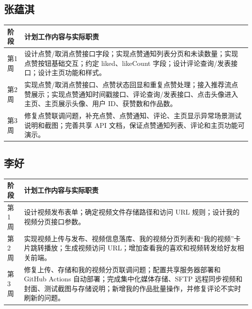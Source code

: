 \documentclass[UTF8,a4paper,12pt,fontset=fandol]{ctexart}
\begin{document}
\subsection{张蕴淇}
\begin{table}[H]
\centering
\small
\begin{tabularx}{\textwidth}{p{1.7cm} X}
\toprule
阶段 & 计划工作内容与实际职责 \\
\midrule
第1周 & 设计点赞/取消点赞接口字段；实现点赞通知列表分页和未读数量；实现点赞按钮基础交互；约定 liked、likeCount 字段；设计评论查询/发表接口；设计主页功能和样式。 \\
第2周 & 实现点赞/取消点赞接口、点赞状态回显和重复点赞处理；接入推荐流点赞展示；实现点赞通知时间戳接口、评论查询/发表接口、点击头像进入主页、主页展示头像、用户 ID、获赞数和作品数。 \\
第3周 & 修复点赞联调问题，补充点赞、点赞通知、评论、主页显示异常场景测试说明和截图；完善共享 API 文档，保证点赞通知列表、评论和主页功能可演示。 \\
\bottomrule
\end{tabularx}
\normalsize
\end{table}

\subsection{李好}
\begin{table}[H]
\centering
\small
\begin{tabularx}{\textwidth}{p{1.7cm} X}
\toprule
阶段 & 计划工作内容与实际职责 \\
\midrule
第1周 & 设计视频发布表单；确定视频文件存储路径和访问 URL 规则；设计我的视频分页接口参数。 \\
第2周 & 实现视频上传与发布、视频信息落库、我的视频分页列表和“我的视频”卡片跳转播放；生成视频访问 URL；增加查看我的喜欢和视频转发给好友相关前端。 \\
第3周 & 修复上传、存储和我的视频分页联调问题；配置共享服务器部署和 GitHub Actions 自动部署；完成集中化媒体存储、SFTP 远程同步视频和封面、测试截图与存储说明；新增我的作品批量操作，并修复评论不实时刷新的问题。 \\
\bottomrule
\end{tabularx}
\normalsize
\end{table}
\end{document}
